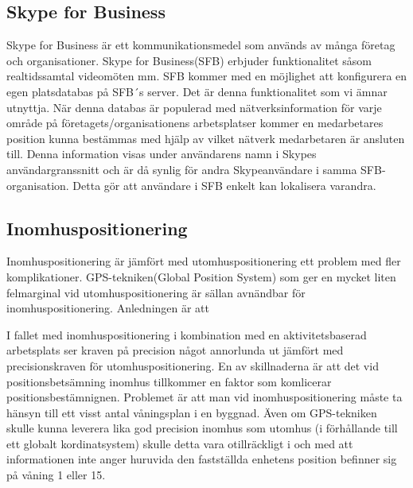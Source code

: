 \documentclass[a4paper,12pt]{article}
\begin{document}
	\subsection{Skype for Business}
    Skype for Business är ett kommunikationsmedel som används av många företag och organisationer. Skype for Business(SFB) erbjuder funktionalitet såsom realtidssamtal %
    videomöten mm. SFB kommer med en möjlighet att konfigurera en egen platsdatabas på SFB´s server.\cite{Microsoft-Office} Det är denna funktionalitet som vi ämnar utnyttja. När denna databas är populerad med nätverksinformation för varje område på företagets/organisationens arbetsplatser kommer en medarbetares position kunna bestämmas med hjälp av vilket nätverk medarbetaren är ansluten till. Denna information visas under användarens namn i Skypes användargranssnitt och är då synlig för andra Skypeanvändare i samma SFB-organisation. Detta gör att användare i SFB enkelt kan lokalisera varandra.
	\subsection{Inomhuspositionering}
    Inomhuspositionering är jämfört med utomhuspositionering ett problem med fler komplikationer. GPS-tekniken(Global Position System) som ger en mycket liten felmarginal vid utomhuspositionering är sällan avnändbar för inomhuspositionering. Anledningen är att \cite{GPS_US} %

    I fallet med inomhuspositionering i kombination med en aktivitetsbaserad arbetsplats ser kraven på precision något annorlunda ut jämfört med precisionskraven för utomhuspositionering. En av skillnaderna är att det vid positionsbetsämning inomhus tillkommer en faktor som komlicerar positionsbestämnignen. Problemet är att man vid inomhuspositionering måste ta hänsyn till ett visst antal våningsplan i en byggnad. Även om GPS-tekniken skulle kunna leverera lika god precision inomhus som utomhus (i förhållande till ett globalt kordinatsystem) skulle detta vara otillräckligt i och med att informationen inte anger huruvida den fastställda enhetens position befinner sig på våning 1 eller 15.





\end{document}
